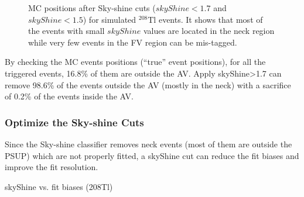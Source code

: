 \begin{figure}
	\centering
	\caption{MC positions after Sky-shine cuts ($skyShine<1.7$ and $skyShine<1.5$) for simulated $^{208}$Tl events. It shows that most of the events with small $skyShine$ values are located in the neck region while very few events in the FV region can be mis-tagged.}\label{skySHineCutsVsMCpos}
\end{figure}

By checking the MC events positions (``true'' event positions),  for all the triggered events, 16.8\% of them are outside the AV. Apply skyShine>1.7 can remove 98.6\% of the events outside the AV (mostly in the neck) with a sacrifice of 0.2\% of the events inside the AV.

\subsubsection{Optimize the Sky-shine Cuts}

Since the Sky-shine classifier removes neck events (most of them are outside the PSUP) which are not properly fitted, a skyShine cut can reduce the fit biases and improve the fit resolution.

skyShine vs. fit biases (208Tl)

